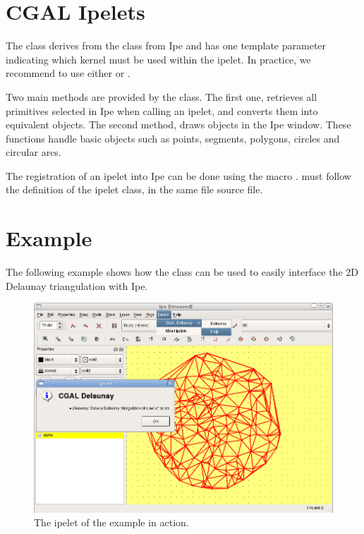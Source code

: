 \section{CGAL Ipelets\label{sec:cgal_ipelets}}

The class  derives from the class  from Ipe
and has one template parameter indicating 
which kernel must be used within the ipelet. 
In practice, we recommend to use either 
or .

Two main methods are provided by the  class.
The first one,  retrieves all
primitives selected in Ipe when calling an ipelet, and converts them into equivalent \cgal{} objects.
The second method,  draws \cgal{} objects in the Ipe
window. These functions handle basic objects such as points, segments, polygons, circles and circular arcs.

The registration of an ipelet into Ipe can be done using the macro
.  
must follow the definition of the ipelet class, in the same file source file.

\section{Example}

The following example shows how the class  can be used to easily
interface the \cgal{} 2D Delaunay triangulation with Ipe.



\begin{ccTexOnly}
  \begin{figure}
    \centerline{\includegraphics[width=.8\textwidth]{CGAL_ipelets/fig/example}}
    \caption{The ipelet of the example in action.}
  \end{figure}
\end{ccTexOnly}


